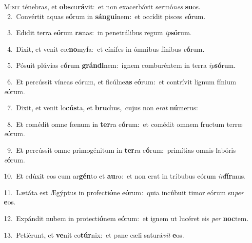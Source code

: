 \lettrine{\initial\textcolor{\initialcolor}{M}}{isit} ténebras, et \textbf{obs}\-cu\-\textbf{rá}\-vit:~\star et non exacerbávit sermó\textit{nes} \textbf{su}\-os.\\
{\numbfont\textcolor{\numbcolor}{~2.}}~Convértit aquas e\-\textbf{ó}\-rum in \textbf{sán}\-\textbf{gui}nem:~\star et occídit pisces \textit{e}\-\textbf{ó}rum.\par
{\numbfont\textcolor{\numbcolor}{~3.}}~Edidit terra e\-\textbf{ó}\-rum \textbf{ra}\-nas:~\star in penetrálibus regum \textit{ip}\-\textbf{só}rum.\par
{\numbfont\textcolor{\numbcolor}{~4.}}~Dixit, et venit cœ\-\textbf{no}\-my\-\textbf{í}\-a:~\star et cínifes in ómnibus fínibus \textit{e}\-\textbf{ó}rum.\par
{\numbfont\textcolor{\numbcolor}{~5.}}~Pósuit plúvias e\-\textbf{ó}\-rum \textbf{grán}\-\textbf{di}nem:~\star ignem comburéntem in terra \textit{ip}\-\textbf{só}rum.\par
{\numbfont\textcolor{\numbcolor}{~6.}}~Et percússit víneas eórum, et ficúlne\textbf{as} e\-\textbf{ó}\-rum:~\star et contrívit lignum fínium \textit{e}\-\textbf{ó}rum.\par
{\numbfont\textcolor{\numbcolor}{~7.}}~Dixit, et venit lo\-\textbf{cús}\-ta, et \textbf{bru}\-chus,~\star cujus non e\textit{rat} \textbf{nú}\-merus:\par
{\numbfont\textcolor{\numbcolor}{~8.}}~Et comédit omne fœnum in \textbf{ter}\-ra e\-\textbf{ó}\-rum:~\star et comédit omnem fructum terræ \textit{e}\-\textbf{ó}rum.\par
{\numbfont\textcolor{\numbcolor}{~9.}}~Et percússit omne primogénitum in \textbf{ter}\-ra e\-\textbf{ó}\-rum:~\star primítias omnis labóris \textit{e}\-\textbf{ó}rum.\par
{\numbfont\textcolor{\numbcolor}{10.}}~Et edúxit eos cum ar\-\textbf{gén}\-to et \textbf{au}\-ro:~\star et non erat in tríbubus eórum \textit{in}\-\textbf{fír}mus.\par
{\numbfont\textcolor{\numbcolor}{11.}}~Lætáta est Ægýptus in profecti\-\textbf{ó}\-ne e\-\textbf{ó}\-rum:~\star quia incúbuit timor eórum su\textit{per} \textbf{e}\-os.\par
{\numbfont\textcolor{\numbcolor}{12.}}~Expándit nubem in protecti\-\textbf{ó}\-nem e\-\textbf{ó}\-rum:~\star et ignem ut lucéret eis \textit{per} \textbf{noc}\-tem.\par
{\numbfont\textcolor{\numbcolor}{13.}}~Petiérunt, et \textbf{ve}\-nit co\-\textbf{túr}\-nix:~\star et pane cæli saturá\textit{vit} \textbf{e}\-os.\par
